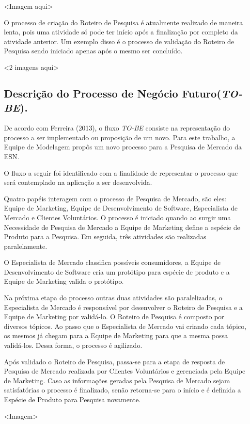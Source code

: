 		<Imagem aqui>

		O processo de criação do Roteiro de Pesquisa é atualmente realizado de maneira lenta, pois uma atividade só pode ter início após a finalização por completo da atividade anterior. Um exemplo disso é o processo de validação do Roteiro de Pesquisa sendo iniciado apenas após o mesmo ser concluído.

		<2 imagens aqui>


	\subsection{Descrição do Processo de Negócio Futuro(\textit{TO-BE}).}

	De acordo com Ferreira (2013), o fluxo \textit{TO-BE} consiste na representação do processo a ser implementado ou proposição de um novo. Para este trabalho, a Equipe de Modelagem propôs um novo processo para a Pesquisa de Mercado da ESN.

	O fluxo a seguir foi identificado com a finalidade de representar o processo que será contemplado na aplicação a ser desenvolvida.

	Quatro papéis interagem com o processo de Pesquisa de Mercado, são eles: Equipe de Marketing, Equipe de Desenvolvimento de Software, Especialista de Mercado e Clientes Voluntários. O processo é iniciado quando ao surgir uma Necessidade de Pesquisa de Mercado a Equipe de Marketing define a espécie de Produto para a Pesquisa. Em seguida, três atividades são realizadas paralelamente. 

	O Especialista de Mercado classifica possíveis consumidores, a Equipe de Desenvolvimento de Software cria um protótipo para espécie de produto e a Equipe de Marketing valida o protótipo.

	Na próxima etapa do processo outras duas atividades são paralelizadas, o Especialista de Mercado é responsável por desenvolver o Roteiro de Pesquisa e a Equipe de Marketing por validá-lo. O Roteiro de Pesquisa é composto por diversos tópicos. Ao passo que o Especialista de Mercado vai criando cada tópico, os mesmos já chegam para a Equipe de Marketing para que a mesma possa validá-los. Dessa forma, o processo é agilizado.

	Após validado o Roteiro de Pesquisa, passa-se para a etapa de resposta de Pesquisa de Mercado realizada por Clientes Voluntários e gerenciada pela Equipe de Marketing. Caso as informações geradas pela Pesquisa de Mercado sejam satisfatórias o processo é finalizado, senão retorna-se para o início e é definida a Espécie de Produto para Pesquisa novamente.


	<Imagem>
